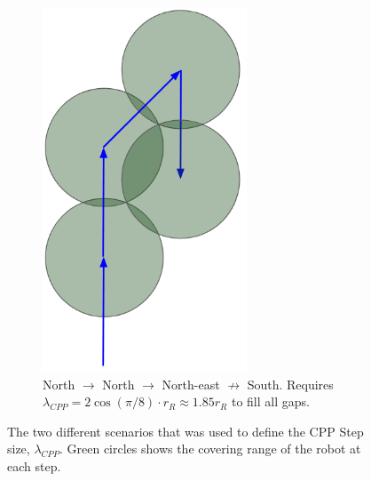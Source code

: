 \begin{figure}
    \begin{subfigure}{0.4\textwidth}
    \centering
    \includegraphics[width=0.67\textwidth]{figures/stepsize_b.png}
    \caption{North $\rightarrow$ North $\rightarrow$ North-east $\nrightarrow$ South. Requires $\lambda_{CPP} = 2\cos(\pi/8) \cdot r_R \approx 1.85r_R$ to fill all gaps.}
    \label{fig:stepsize_b}
    \end{subfigure}
    \caption{The two different scenarios that was used to define the CPP Step size, $\lambda_{CPP}$. Green circles shows the covering range of the robot at each step.}
    \label{fig:stepsize}
\end{figure}